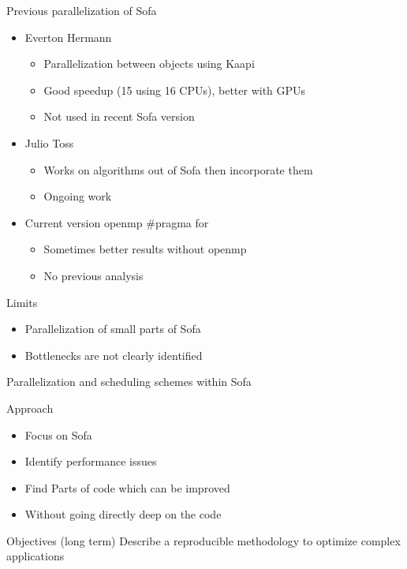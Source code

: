 \documentclass[xcolor={usenames,dvipsnames}]{beamer}
\begin{document}
\begin{frame}{Previous parallelization of Sofa}
    \begin{itemize}[<+->]
        \item Everton Hermann \cite{Hermann10Simulations} \\
            \begin{itemize}
                \item Parallelization between objects using Kaapi
                \item Good speedup (15 using 16 CPUs), better with GPUs
                \item Not used in recent Sofa version 
            \end{itemize}
        \item Julio Toss \cite{Toss12New}
            \begin{itemize}
                \item Works on algorithms out of Sofa then incorporate them
                \item Ongoing work
            \end{itemize}
        \item Current version openmp \#pragma for
            \begin{itemize}
                \item Sometimes better results without openmp
                \item No previous analysis
            \end{itemize}
    \end{itemize}
    {
        \begin{alertblock}{Limits}
            \begin{itemize}
                \item Parallelization of small parts of Sofa
                \item Bottlenecks are not clearly identified
            \end{itemize}
        \end{alertblock}
    }
\end{frame}
\begin{frame}{Parallelization and scheduling schemes within Sofa}
    \pause
    \begin{block}{Approach}
        \begin{itemize}
            \item Focus on Sofa 
            \item Identify performance issues
            \item Find Parts of code which can be improved
            \item Without going directly deep on the code 
        \end{itemize}
    \end{block}
    \pause
    \begin{alertblock}{Objectives (long term)}
        Describe a reproducible methodology to optimize complex applications
    \end{alertblock}
\end{frame}
\end{document}
